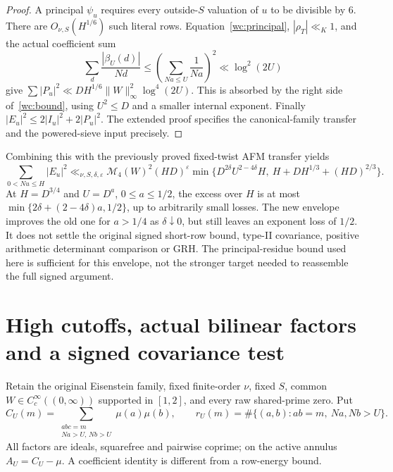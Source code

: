 \documentclass[11pt]{article}
\begin{document}
\begin{proof}
A principal $\psi_u$ requires every outside-$S$ valuation of $u$ to
be divisible by $6$. There are $O_{\nu,S}(H^{1/6})$ such literal
rows. Equation~\eqref{wc:principal}, $|\rho_T|\ll_K1$, and the actual
coefficient sum
\[
 \sum_d\frac{|\beta_U(d)|}{Nd}
 \le\left(\sum_{Na\le U}\frac1{Na}\right)^2\ll\log^2(2U)
\]
give $\sum|P_u|^2\ll DH^{1/6}\|W\|_\infty^2\log^4(2U)$.
This is absorbed by the right side of~\eqref{wc:bound}, using
$U^2\le D$ and a smaller internal exponent. Finally
$|E_u|^2\le2|I_u|^2+2|P_u|^2$. The extended proof specifies the
canonical-family transfer and the powered-sieve input precisely.
\end{proof}

Combining this with the previously proved fixed-twist AFM transfer yields
\begin{equation}\label{wc:minimum}
 \sum_{0<Nu\le H}|E_u|^2\ll_{\nu,S,\delta,\varepsilon}
 \mathcal M_4(W)^2(HD)^\varepsilon
 \min\{D^{2\delta}U^{2-4\delta}H,\ H+DH^{1/3}+(HD)^{2/3}\}.
\end{equation}
At $H=D^{3/4}$ and $U=D^a$, $0\le a\le1/2$, the excess over $H$
is at most $\min\{2\delta+(2-4\delta)a,1/2\}$, up to arbitrarily
small losses. The new envelope improves the old one for $a>1/4$ as
$\delta\downarrow0$, but still leaves an exponent loss of $1/2$.
It does not settle the original signed short-row bound, type-II covariance,
positive arithmetic determinant comparison or GRH. The principal-residue
bound used here is sufficient for this envelope, not the stronger target
needed to reassemble the full signed argument.

\section{High cutoffs, actual bilinear factors and a signed covariance test}\label{sb:core}
Retain the original Eisenstein family, fixed finite-order $\nu$, fixed $S$,
common $W\in C_c^\infty((0,\infty))$ supported in $[1,2]$, and every raw
shared-prime zero. Put
\[
 C_U(m)=\sum_{\substack{abc=m\\Na>U,\,Nb>U}}\mu(a)\mu(b),\qquad
 r_U(m)=\#\{(a,b):ab=m,\ Na,Nb>U\}.
\]
All factors are ideals, squarefree and pairwise coprime; on the active
annulus $A_U=C_U-\mu$. A coefficient identity is different from a row-energy bound.
\end{document}
